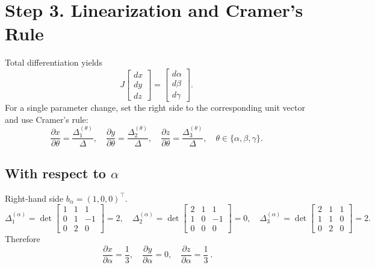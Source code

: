 \documentclass[12pt]{article}
\begin{document}
\section*{Step 3. Linearization and Cramer's Rule}
Total differentiation yields
\[
J
\begin{bmatrix}
dx\\ dy\\ dz
\end{bmatrix}
=
\begin{bmatrix}
d\alpha\\ d\beta\\ d\gamma
\end{bmatrix}.
\]
For a single parameter change, set the right side to the corresponding unit vector and use Cramer's rule:
\[
\frac{\partial x}{\partial \theta}=\frac{\Delta_1^{(\theta)}}{\Delta},\quad
\frac{\partial y}{\partial \theta}=\frac{\Delta_2^{(\theta)}}{\Delta},\quad
\frac{\partial z}{\partial \theta}=\frac{\Delta_3^{(\theta)}}{\Delta},\quad
\theta\in\{\alpha,\beta,\gamma\}.
\]

\subsection*{With respect to $\alpha$}
Right-hand side $b_\alpha=(1,0,0)^\top$.
\[
\Delta_1^{(\alpha)}=
\det\!\begin{bmatrix}
1 & 1 & 1\\
0 & 1 & -1\\
0 & 2 & 0
\end{bmatrix}=2,\quad
\Delta_2^{(\alpha)}=
\det\!\begin{bmatrix}
2 & 1 & 1\\
1 & 0 & -1\\
0 & 0 & 0
\end{bmatrix}=0,\quad
\Delta_3^{(\alpha)}=
\det\!\begin{bmatrix}
2 & 1 & 1\\
1 & 1 & 0\\
0 & 2 & 0
\end{bmatrix}=2.
\]
Therefore
\[
\boxed{\ \frac{\partial x}{\partial \alpha}=\frac{1}{3},\quad
\frac{\partial y}{\partial \alpha}=0,\quad
\frac{\partial z}{\partial \alpha}=\frac{1}{3}\ }.
\]
\end{document}
